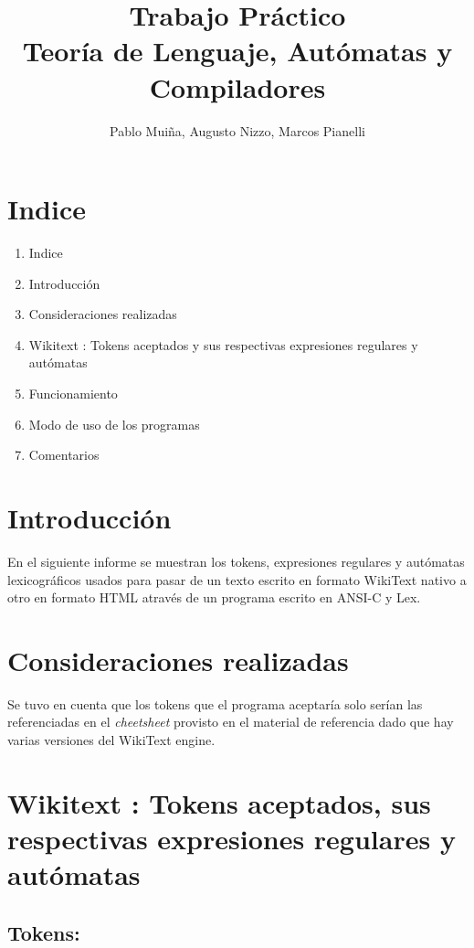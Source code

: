 \documentclass[a4paper,11pt]{article}
\title{Trabajo Pr\'actico \\ Teor\'ia de Lenguaje, Aut\'omatas y Compiladores }
\author{Pablo Mui\~na, Augusto Nizzo, Marcos Pianelli}
\begin{document}
\maketitle

\section{ Indice }

\begin{enumerate}
\item Indice
\item Introducci\'on
\item Consideraciones realizadas
\item Wikitext : Tokens aceptados y sus respectivas expresiones regulares y aut\'omatas
\item Funcionamiento
\item Modo de uso de los programas
\item Comentarios

\end{enumerate}


\section{ Introducci\'on }

En el siguiente informe se muestran los tokens, expresiones regulares y aut\'omatas lexicogr\'aficos usados para pasar de un texto escrito en formato WikiText nativo a otro en formato HTML atrav\'es de un programa escrito en ANSI-C y Lex.\\






\section{ Consideraciones realizadas }

Se tuvo en cuenta que los tokens que el programa aceptar\'ia solo ser\'ian las referenciadas en el \emph{cheetsheet} provisto en el material de referencia dado que hay varias versiones del WikiText engine.

\section{Wikitext : Tokens aceptados, sus respectivas expresiones regulares y aut\'omatas}

\subsection{Tokens:}
\end{document}
